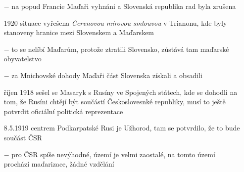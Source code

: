 \documentclass{article}
\begin{document}
\begin{itemize}
    \item[$-$]  na popud Francie Maďaři vyhnáni a Slovenská republika rad byla zrušena
    \item[1920] situace vyřešena \textit{Červnovou mírovou smlouvou} v Trianonu, kde byly stanoveny hranice mezi Slovenskem a Maďarskem
    \item[$-$] to se nelíbí Maďarům, protože ztratili Slovensko, zůstává tam maďarské obyvatelstvo
    \item[$-$] za Mnichovské dohody Maďaři část Slovenska získali a obsadili
    \item[říjen 1918] sešel se Masaryk s Rusíny ve Spojených státech, kde se dohodli na  tom, že Rusíni chtějí být součástí Českoslovesnké republiky, musí to ještě potvrdit oficiální politická reprezentace
    \item[8.5.1919] centrem Podkarpatské Rusi je Užhorod, tam se potvrdilo, že to bude součást ČSR
    \item[$-$] pro ČSR spíše nevýhodné, území je velmi zaostalé, na tomto území prochází maďarizace, žádné vzdělání
\end{itemize}
\end{document}
